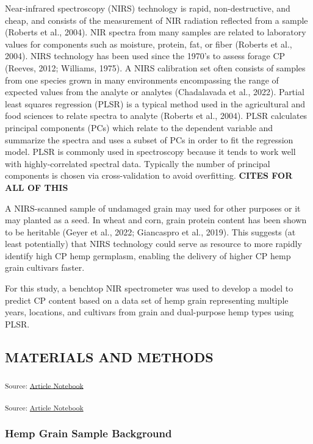 \documentclass[
]{agujournal2019}
\begin{document}
Near-infrared spectroscopy (NIRS) technology is rapid, non-destructive,
and cheap, and consists of the measurement of NIR radiation reflected
from a sample (Roberts et al., 2004). NIR spectra from many samples are
related to laboratory values for components such as moisture, protein,
fat, or fiber (Roberts et al., 2004). NIRS technology has been used
since the 1970's to assess forage CP (Reeves, 2012; Williams, 1975). A
NIRS calibration set often consists of samples from one species grown in
many environments encompassing the range of expected values from the
analyte or analytes (Chadalavada et al., 2022). Partial least squares
regression (PLSR) is a typical method used in the agricultural and food
sciences to relate spectra to analyte (Roberts et al., 2004). PLSR
calculates principal components (PCs) which relate to the dependent
variable and summarize the spectra and uses a subset of PCs in order to
fit the regression model. PLSR is commonly used in spectroscopy because
it tends to work well with highly-correlated spectral data. Typically
the number of principal components is chosen via cross-validation to
avoid overfitting. \textbf{CITES FOR ALL OF THIS}

A NIRS-scanned sample of undamaged grain may used for other purposes or
it may planted as a seed. In wheat and corn, grain protein content has
been shown to be heritable (Geyer et al., 2022; Giancaspro et al.,
2019). This suggests (at least potentially) that NIRS technology could
serve as resource to more rapidly identify high CP hemp germplasm,
enabling the delivery of higher CP hemp grain cultivars faster.

For this study, a benchtop NIR spectrometer was used to develop a model
to predict CP content based on a data set of hemp grain representing
multiple years, locations, and cultivars from grain and dual-purpose
hemp types using PLSR.

\subsection{MATERIALS AND METHODS}\label{materials-and-methods}

\textsubscript{Source:
\href{https://rvcrawford.github.io/glowing-system/index.qmd.html}{Article
Notebook}}

\textsubscript{Source:
\href{https://rvcrawford.github.io/glowing-system/index.qmd.html}{Article
Notebook}}

\subsubsection{Hemp Grain Sample
Background}\label{hemp-grain-sample-background}
\end{document}
